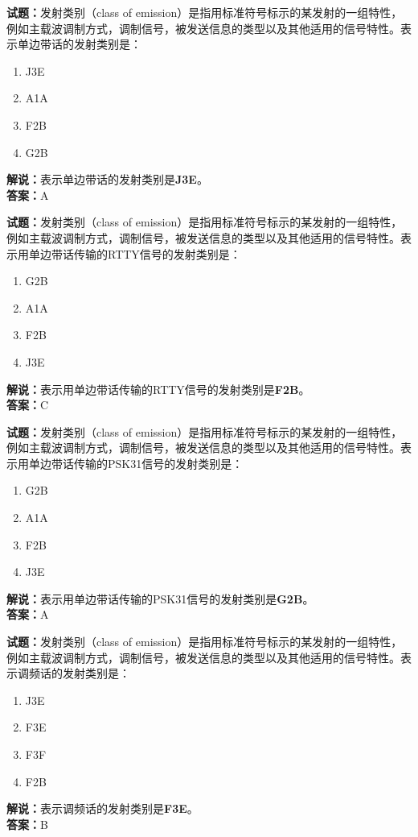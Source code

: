 \documentclass{ctexbook}
\begin{document}
\textbf{试题：}发射类别（class of emission）是指用标准符号标示的某发射的一组特性，例如主载波调制方式，调制信号，被发送信息的类型以及其他适用的信号特性。表示单边带话的发射类别是：
\begin{enumerate}[leftmargin=3em]
  \item J3E
  \item A1A
  \item F2B
  \item G2B
\end{enumerate}
\noindent\textbf{解说：}表示单边带话的发射类别是\textbf{J3E}。\\\noindent\textbf{答案：}A

\vspace{1em}

\textbf{试题：}发射类别（class of emission）是指用标准符号标示的某发射的一组特性，例如主载波调制方式，调制信号，被发送信息的类型以及其他适用的信号特性。表示用单边带话传输的RTTY信号的发射类别是：
\begin{enumerate}[leftmargin=3em]
  \item G2B
  \item A1A
  \item F2B
  \item J3E
\end{enumerate}
\noindent\textbf{解说：}表示用单边带话传输的RTTY信号的发射类别是\textbf{F2B}。\\\noindent\textbf{答案：}C

\vspace{1em}

\textbf{试题：}发射类别（class of emission）是指用标准符号标示的某发射的一组特性，例如主载波调制方式，调制信号，被发送信息的类型以及其他适用的信号特性。表示用单边带话传输的PSK31信号的发射类别是：
\begin{enumerate}[leftmargin=3em]
  \item G2B
  \item A1A
  \item F2B
  \item J3E
\end{enumerate}
\noindent\textbf{解说：}表示用单边带话传输的PSK31信号的发射类别是\textbf{G2B}。\\\noindent\textbf{答案：}A

\vspace{1em}

\textbf{试题：}发射类别（class of emission）是指用标准符号标示的某发射的一组特性，例如主载波调制方式，调制信号，被发送信息的类型以及其他适用的信号特性。表示调频话的发射类别是：
\begin{enumerate}[leftmargin=3em]
  \item J3E
  \item F3E
  \item F3F
  \item F2B
\end{enumerate}
\noindent\textbf{解说：}表示调频话的发射类别是\textbf{F3E}。\\\noindent\textbf{答案：}B
\end{document}
